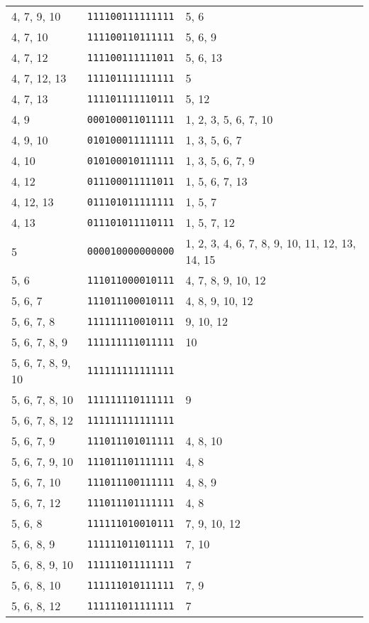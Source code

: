 \documentclass[a4paper,12pt]{article}
\begin{document}
\begin{longtable}{l|l|l}
        4, 7, 9, 10&\texttt{111100111111111}&5, 6\\
        4, 7, 10&\texttt{111100110111111}&5, 6, 9\\
        4, 7, 12&\texttt{111100111111011}&5, 6, 13\\
        4, 7, 12, 13&\texttt{111101111111111}&5\\
        4, 7, 13&\texttt{111101111110111}&5, 12\\
        4, 9&\texttt{000100011011111}&1, 2, 3, 5, 6, 7, 10\\
        4, 9, 10&\texttt{010100011111111}&1, 3, 5, 6, 7\\
        4, 10&\texttt{010100010111111}&1, 3, 5, 6, 7, 9\\
        4, 12&\texttt{011100011111011}&1, 5, 6, 7, 13\\
        4, 12, 13&\texttt{011101011111111}&1, 5, 7\\
        4, 13&\texttt{011101011110111}&1, 5, 7, 12\\
        5&\texttt{000010000000000}&1, 2, 3, 4, 6, 7, 8, 9, 10, 11, 12, 13, 14, 15\\
        5, 6&\texttt{111011000010111}&4, 7, 8, 9, 10, 12\\
        5, 6, 7&\texttt{111011100010111}&4, 8, 9, 10, 12\\
        5, 6, 7, 8&\texttt{111111110010111}&9, 10, 12\\
        5, 6, 7, 8, 9&\texttt{111111111011111}&10\\
        5, 6, 7, 8, 9, 10&\texttt{111111111111111}&\\
        5, 6, 7, 8, 10&\texttt{111111110111111}&9\\
        5, 6, 7, 8, 12&\texttt{111111111111111}&\\
        5, 6, 7, 9&\texttt{111011101011111}&4, 8, 10\\
        5, 6, 7, 9, 10&\texttt{111011101111111}&4, 8\\
        5, 6, 7, 10&\texttt{111011100111111}&4, 8, 9\\
        5, 6, 7, 12&\texttt{111011101111111}&4, 8\\
        5, 6, 8&\texttt{111111010010111}&7, 9, 10, 12\\
        5, 6, 8, 9&\texttt{111111011011111}&7, 10\\
        5, 6, 8, 9, 10&\texttt{111111011111111}&7\\
        5, 6, 8, 10&\texttt{111111010111111}&7, 9\\
        5, 6, 8, 12&\texttt{111111011111111}&7\\

\end{longtable}
\end{document}
